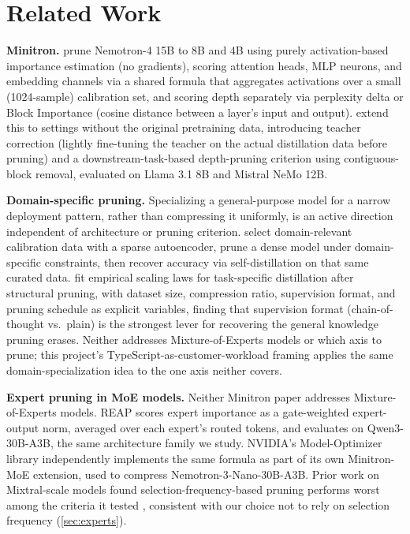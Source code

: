 \documentclass{article}
\theoremstyle{plain}
\theoremstyle{definition}
\theoremstyle{remark}
\begin{document}
\section{Related Work}
\label{sec:related}

\textbf{Minitron.} \citet{minitron2024} prune Nemotron-4 15B to 8B and 4B
using purely activation-based importance estimation (no gradients), scoring
attention heads, MLP neurons, and embedding channels via a shared formula
that aggregates activations over a small (1024-sample) calibration set, and
scoring depth separately via perplexity delta or Block Importance (cosine
distance between a layer's input and output). \citet{minitron2024practice}
extend this to settings without the original pretraining data, introducing
teacher correction (lightly fine-tuning the teacher on the actual
distillation data before pruning) and a downstream-task-based depth-pruning
criterion using contiguous-block removal, evaluated on Llama 3.1 8B and
Mistral NeMo 12B.

\textbf{Domain-specific pruning.} Specializing a general-purpose model for
a narrow deployment pattern, rather than compressing it uniformly, is an
active direction independent of architecture or pruning criterion.
\citet{finescope2025} select domain-relevant calibration data with a
sparse autoencoder, prune a dense model under domain-specific
constraints, then recover accuracy via self-distillation on that same
curated data. \citet{scalinglaws2026} fit empirical scaling laws for
task-specific distillation after structural pruning, with dataset size,
compression ratio, supervision format, and pruning schedule as explicit
variables, finding that supervision format (chain-of-thought vs.\ plain)
is the strongest lever for recovering the general knowledge pruning
erases. Neither addresses Mixture-of-Experts models or which axis to
prune; this project's TypeScript-as-customer-workload framing applies
the same domain-specialization idea to the one axis neither covers.

\textbf{Expert pruning in MoE models.} Neither Minitron paper addresses
Mixture-of-Experts models. REAP \cite{reap2025} scores expert importance as
a gate-weighted expert-output norm, averaged over each expert's routed
tokens, and evaluates on Qwen3-30B-A3B, the same architecture family we
study. NVIDIA's Model-Optimizer library \cite{modelopt2024} independently
implements the same formula as part of its own Minitron-MoE extension,
used to compress Nemotron-3-Nano-30B-A3B.
Prior work on Mixtral-scale models found selection-frequency-based pruning
performs worst among the criteria it tested \cite{naee2024}, consistent
with our choice not to rely on selection frequency (\cref{sec:experts}).
\end{document}
